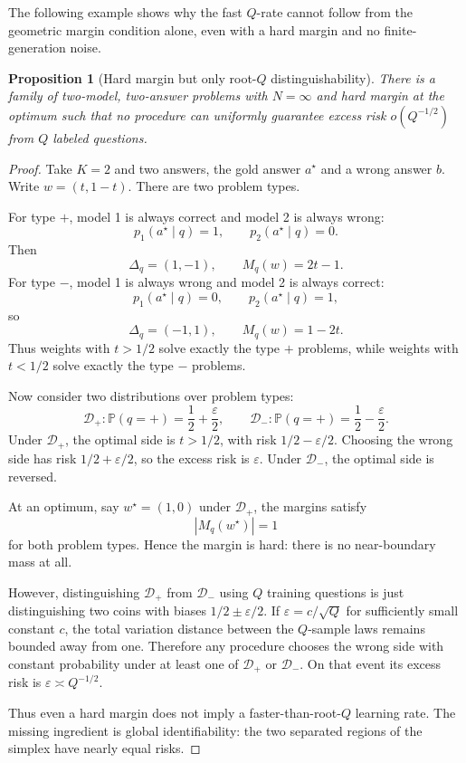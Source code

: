 \documentclass[11pt]{article}
\newtheorem{proposition}{Proposition}
\newcommand{\D}{\mathcal D}
\newcommand{\Pp}{\mathbb P}
\newcommand{\eps}{\varepsilon}
\begin{document}
The following example shows why the fast $Q$-rate cannot follow from the geometric margin condition alone, even with a hard margin and no finite-generation noise.

\begin{proposition}[Hard margin but only root-$Q$ distinguishability]
\label{prop:counterexample}
There is a family of two-model, two-answer problems with $N=\infty$ and hard margin at the optimum such that no procedure can uniformly guarantee excess risk $o(Q^{-1/2})$ from $Q$ labeled questions.
\end{proposition}

\begin{proof}
Take $K=2$ and two answers, the gold answer $a^\star$ and a wrong answer $b$.  Write $w=(t,1-t)$.  There are two problem types.

For type $+$, model 1 is always correct and model 2 is always wrong:
\[
p_1(a^\star\mid q)=1,
\qquad
p_2(a^\star\mid q)=0.
\]
Then
\[
\Delta_q=(1,-1),
\qquad
M_q(w)=2t-1.
\]
For type $-$, model 1 is always wrong and model 2 is always correct:
\[
p_1(a^\star\mid q)=0,
\qquad
p_2(a^\star\mid q)=1,
\]
so
\[
\Delta_q=(-1,1),
\qquad
M_q(w)=1-2t.
\]
Thus weights with $t>1/2$ solve exactly the type $+$ problems, while weights with $t<1/2$ solve exactly the type $-$ problems.

Now consider two distributions over problem types:
\[
\D_+:
\Pp(q=+)=\frac12+\frac\eps2,
\qquad
\D_-:
\Pp(q=+)=\frac12-\frac\eps2.
\]
Under $\D_+$, the optimal side is $t>1/2$, with risk $1/2-\eps/2$.  Choosing the wrong side has risk $1/2+\eps/2$, so the excess risk is $\eps$.  Under $\D_-$, the optimal side is reversed.

At an optimum, say $w^\star=(1,0)$ under $\D_+$, the margins satisfy
\[
|M_q(w^\star)|=1
\]
for both problem types.  Hence the margin is hard: there is no near-boundary mass at all.

However, distinguishing $\D_+$ from $\D_-$ using $Q$ training questions is just distinguishing two coins with biases $1/2\pm\eps/2$.  If $\eps=c/\sqrt Q$ for sufficiently small constant $c$, the total variation distance between the $Q$-sample laws remains bounded away from one.  Therefore any procedure chooses the wrong side with constant probability under at least one of $\D_+$ or $\D_-$.  On that event its excess risk is $\eps\asymp Q^{-1/2}$.

Thus even a hard margin does not imply a faster-than-root-$Q$ learning rate.  The missing ingredient is global identifiability: the two separated regions of the simplex have nearly equal risks.
\end{proof}
\end{document}
